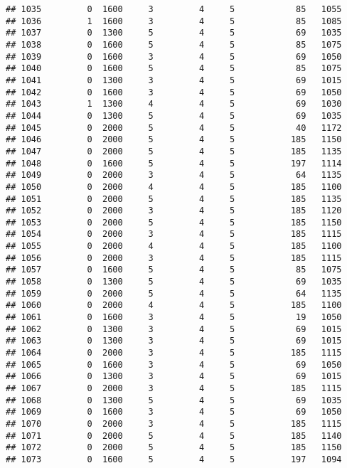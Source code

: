 \documentclass[]{article}
\begin{document}
\begin{verbatim}
## 1035         0  1600     3         4     5            85   1055
## 1036         1  1600     3         4     5            85   1085
## 1037         0  1300     5         4     5            69   1035
## 1038         0  1600     5         4     5            85   1075
## 1039         0  1600     3         4     5            69   1050
## 1040         0  1600     5         4     5            85   1075
## 1041         0  1300     3         4     5            69   1015
## 1042         0  1600     3         4     5            69   1050
## 1043         1  1300     4         4     5            69   1030
## 1044         0  1300     5         4     5            69   1035
## 1045         0  2000     5         4     5            40   1172
## 1046         0  2000     5         4     5           185   1150
## 1047         0  2000     5         4     5           185   1135
## 1048         0  1600     5         4     5           197   1114
## 1049         0  2000     3         4     5            64   1135
## 1050         0  2000     4         4     5           185   1100
## 1051         0  2000     5         4     5           185   1135
## 1052         0  2000     3         4     5           185   1120
## 1053         0  2000     5         4     5           185   1150
## 1054         0  2000     3         4     5           185   1115
## 1055         0  2000     4         4     5           185   1100
## 1056         0  2000     3         4     5           185   1115
## 1057         0  1600     5         4     5            85   1075
## 1058         0  1300     5         4     5            69   1035
## 1059         0  2000     5         4     5            64   1135
## 1060         0  2000     4         4     5           185   1100
## 1061         0  1600     3         4     5            19   1050
## 1062         0  1300     3         4     5            69   1015
## 1063         0  1300     3         4     5            69   1015
## 1064         0  2000     3         4     5           185   1115
## 1065         0  1600     3         4     5            69   1050
## 1066         0  1300     3         4     5            69   1015
## 1067         0  2000     3         4     5           185   1115
## 1068         0  1300     5         4     5            69   1035
## 1069         0  1600     3         4     5            69   1050
## 1070         0  2000     3         4     5           185   1115
## 1071         0  2000     5         4     5           185   1140
## 1072         0  2000     5         4     5           185   1150
## 1073         0  1600     5         4     5           197   1094

\end{verbatim}
\end{document}
